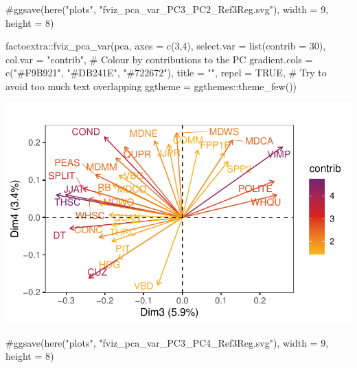 \documentclass[
  letterpaper,
  DIV=11,
  numbers=noendperiod]{scrreprt}
\newenvironment{Shaded}{\begin{snugshade}}{\end{snugshade}}
\newcommand{\AttributeTok}[1]{\textcolor[rgb]{0.40,0.45,0.13}{#1}}
\newcommand{\CommentTok}[1]{\textcolor[rgb]{0.37,0.37,0.37}{#1}}
\newcommand{\ConstantTok}[1]{\textcolor[rgb]{0.56,0.35,0.01}{#1}}
\newcommand{\DecValTok}[1]{\textcolor[rgb]{0.68,0.00,0.00}{#1}}
\newcommand{\FunctionTok}[1]{\textcolor[rgb]{0.28,0.35,0.67}{#1}}
\newcommand{\NormalTok}[1]{\textcolor[rgb]{0.00,0.23,0.31}{#1}}
\newcommand{\SpecialCharTok}[1]{\textcolor[rgb]{0.37,0.37,0.37}{#1}}
\newcommand{\StringTok}[1]{\textcolor[rgb]{0.13,0.47,0.30}{#1}}
\begin{document}
\begin{Shaded}
\begin{Highlighting}[]
\CommentTok{\#ggsave(here("plots", "fviz\_pca\_var\_PC3\_PC2\_Ref3Reg.svg"), width = 9, height = 8)}

\NormalTok{factoextra}\SpecialCharTok{::}\FunctionTok{fviz\_pca\_var}\NormalTok{(pca,}
             \AttributeTok{axes =} \FunctionTok{c}\NormalTok{(}\DecValTok{3}\NormalTok{,}\DecValTok{4}\NormalTok{),}
             \AttributeTok{select.var =} \FunctionTok{list}\NormalTok{(}\AttributeTok{contrib =} \DecValTok{30}\NormalTok{),}
             \AttributeTok{col.var =} \StringTok{"contrib"}\NormalTok{, }\CommentTok{\# Colour by contributions to the PC}
             \AttributeTok{gradient.cols =} \FunctionTok{c}\NormalTok{(}\StringTok{"\#F9B921"}\NormalTok{, }\StringTok{"\#DB241E"}\NormalTok{, }\StringTok{"\#722672"}\NormalTok{),}
             \AttributeTok{title =} \StringTok{""}\NormalTok{,}
             \AttributeTok{repel =} \ConstantTok{TRUE}\NormalTok{, }\CommentTok{\# Try to avoid too much text overlapping}
             \AttributeTok{ggtheme =}\NormalTok{ ggthemes}\SpecialCharTok{::}\FunctionTok{theme\_few}\NormalTok{())}
\end{Highlighting}
\end{Shaded}

\includegraphics{G_Ch7_Analysis_files/figure-pdf/graphs-of-variables-3.pdf}

\begin{Shaded}
\begin{Highlighting}[]
\CommentTok{\#ggsave(here("plots", "fviz\_pca\_var\_PC3\_PC4\_Ref3Reg.svg"), width = 9, height = 8)}
\end{Highlighting}
\end{Shaded}
\end{document}
